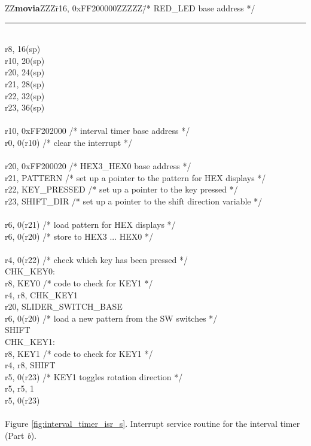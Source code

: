 \begin{center}
\begin{minipage}[t]{12.5 cm}
\begin{tabbing}
ZZ\={\bf movia}ZZZ\=r16, 0xFF200000ZZZZZ\=/* RED\_LED base address */\kill
\rule{6.0in}{0in}~\\
		\>r8, 16(sp)\\
		\>r10, 20(sp)\\
		\>r20, 24(sp)\\
		\>r21, 28(sp)\\
		\>r22, 32(sp)\\
		\>r23, 36(sp)\\\\
 \>r10, 0xFF202000 \>/* interval timer base address */\\
 \>r0,  0(r10) \>/* clear the interrupt */\\
~\\
 \>r20, 0xFF200020 \>/* HEX3\_HEX0 base address */\\
 \>r21, PATTERN \>/* set up a pointer to the pattern for HEX displays */\\
 \>r22, KEY\_PRESSED \>/* set up a pointer to the key pressed */\\
 \>r23, SHIFT\_DIR \>/* set up a pointer to the shift direction variable */\\
~\\
 \>r6, 0(r21) \>/* load pattern for HEX displays */\\
 \>r6, 0(r20) \>/* store to HEX3 ... HEX0 */\\
~\\
 \>r4, 0(r22) \>/* check which key has been pressed */\\
CHK\_KEY0:	\\
	\>r8, KEY0	\>/* code to check for KEY1 */\\
	\>r4, r8, CHK\_KEY1\\
	\>r20, SLIDER\_SWITCH\_BASE\\
	\>r6, 0(r20)	\>/* load a new pattern from the SW switches */\\
	\>SHIFT\\
CHK\_KEY1:	\\
	\>r8, KEY1	\>/* code to check for KEY1 */\\
	\>r4, r8, SHIFT\\
	\>r5, 0(r23)	\>/* KEY1 toggles rotation direction */\\
	\>r5, r5, 1 \\
		\>r5, 0(r23) \\
~\\
Figure \ref{fig:interval_timer_isr_s}. Interrupt service routine for the interval timer (Part {\it b}).
\end{tabbing}
\end{minipage}
\end{center}

